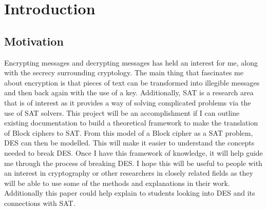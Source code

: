 \documentclass[11pt,a4paper, notitlepage]{report}
\begin{document}
\tableofcontents

















































\chapter{Introduction}
\label{cha:Introduction}

\section{Motivation}
\label{cha:Motivation}

Encrypting messages and decrypting messages has held an interest for me, along with the secrecy surrounding cryptology. The main thing that fascinates me about encryption is that pieces of text can be transformed into illegible messages and then back again with the use of a key. Additionally, SAT is a research area that is of interest as it provides a way of solving complicated problems via the use of SAT solvers.  This project will be an accomplishment if I can outline existing documentation to build a theoretical framework to make the translation of Block ciphers to SAT. From this model of a Block cipher as a SAT problem, DES can then be modelled. This will make it easier to understand the concepts needed to break DES. Once I have this framework of knowledge, it will help guide me through the process of breaking DES. I hope this will be useful to people with an interest in cryptography or other researchers in closely related fields as they will be able to use some of the methods and explanations in their work. Additionally this paper could help explain to students looking into DES and its connections with SAT.
\end{document}
